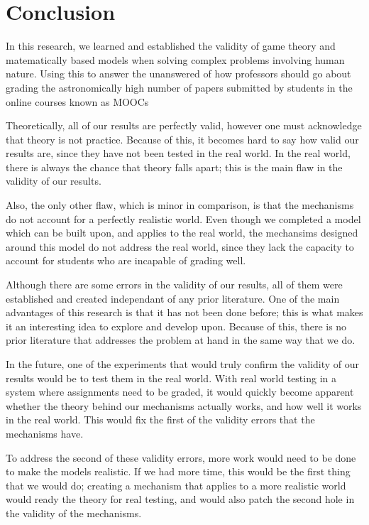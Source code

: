 \documentclass[12pt, Arial]{article}
\begin{document}
\section{Conclusion}
In this research, we learned and established the validity of game theory and matematically based models when solving complex problems involving human nature. Using this to answer the unanswered of how professors should go about grading the astronomically high number of papers submitted by students in the online courses known as MOOCs

Theoretically, all of our results are perfectly valid, however one must acknowledge that theory is not practice. Because of this, it becomes hard to say how valid our results are, since they have not been tested in the real world. In the real world, there is always the chance that theory falls apart; this is the main flaw in the validity of our results.

Also, the only other flaw, which is minor in comparison, is that the mechanisms do not account for a perfectly realistic world. Even though we completed a model which can be built upon, and applies to the real world, the mechansims designed around this model do not address the real world, since they lack the capacity to account for students who are incapable of grading well.

Although there are some errors in the validity of our results, all of them were established and created independant of any prior literature. One of the main advantages of this research is that it has not been done before; this is what makes it an interesting idea to explore and develop upon. Because of this, there is no prior literature that addresses the problem at hand in the same way that we do.

In the future, one of the experiments that would truly confirm the validity of our results would be to test them in the real world. With real world testing in a system where assignments need to be graded, it would quickly become apparent whether the theory behind our mechanisms actually works, and how well it works in the real world. This would fix the first of the validity errors that the mechanisms have.

To address the second of these validity errors, more work would need to be done to make the models realistic. If we had more time, this would be the first thing that we would do; creating a mechanism that applies to a more realistic world would ready the theory for real testing, and would also patch the second hole in the validity of the mechanisms.
\end{document}
